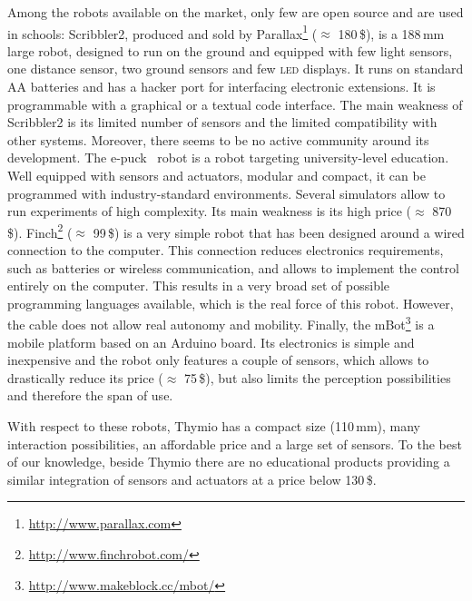 \documentclass[letterpaper, 10 pt, conference]{ieeeconf}  %
\begin{document}
Among the robots available on the market, only few are open source and are used in schools:
Scribbler2, produced and sold by Parallax\footnote{\url{http://www.parallax.com}} ($\approx$ 180\,\$), is a 188\,mm large robot, designed to run on the ground and equipped with few light sensors, one distance sensor, two ground sensors and few \textsc{led} displays.
It runs on standard AA batteries and has a hacker port for interfacing electronic extensions.
It is programmable with a graphical or a textual code interface.  
The main weakness of Scribbler2 is its limited number of sensors and the limited compatibility with other systems. 
Moreover, there seems to be no active community around its development.
The e-puck~\cite{mondada2009puck} robot is a robot targeting university-level education.
Well equipped with sensors and actuators, modular and compact, it can be programmed with industry-standard environments.
Several simulators allow to run experiments of high complexity. 
Its main weakness is its high price ($\approx$ 870\,\$).
Finch\footnote{\url{http://www.finchrobot.com/}} ($\approx$ 99\,\$) is a very simple robot that has been designed around a wired connection to the computer. 
This connection reduces electronics requirements, such as batteries or wireless communication, and allows to implement the control entirely on the computer.
This results in a very broad set of possible programming languages available, which is the real force of this robot. 
However, the cable does not allow real autonomy and mobility.
Finally, the mBot\footnote{\url{http://www.makeblock.cc/mbot/}} is a mobile platform based on an Arduino board.
Its electronics is simple and inexpensive and the robot only features a couple of sensors, which allows to drastically reduce its price ($\approx$ 75\,\$), but also limits the perception possibilities and therefore the span of use.

With respect to these robots, Thymio has a compact size (110\,mm), many interaction possibilities, an affordable price and a large set of sensors.
To the best of our knowledge, beside Thymio there are no educational products providing a similar integration of sensors and actuators at a price below 130\,\$.
\end{document}
